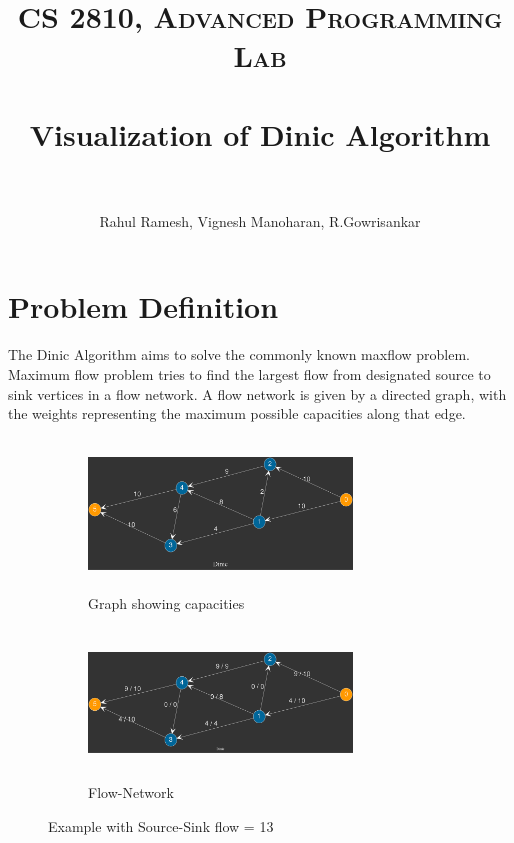 \documentclass[paper=a4, fontsize=11pt]{scrartcl} %
\title{
\normalfont \normalsize
\textsc{CS 2810, Advanced Programming Lab} \\ [25pt] %
\horrule{0.5pt} \\[0.4cm] %
\huge Visualization of Dinic Algorithm\\ %
\horrule{2pt} \\[0.5cm] %
}
\author{Rahul Ramesh, Vignesh Manoharan, R.Gowrisankar} %
\date{} %
\numberwithin{equation}{section} %
\numberwithin{figure}{section} %
\numberwithin{table}{section} %
\begin{document}
\maketitle %


\section{Problem Definition}

The Dinic Algorithm aims to solve the commonly known maxflow problem. Maximum flow problem tries to find the largest flow from designated source to sink vertices in a flow network. A flow network is given by a directed graph, with the weights representing the maximum possible capacities along that edge.

\begin{figure}[h]
\begin{subfigure}{0.5\textwidth}
\includegraphics[width=7cm, height=4cm,center]{p1.png}
\caption{Graph showing capacities}
\label{fig:subim1}
\end{subfigure}
\begin{subfigure}{0.5\textwidth}
\includegraphics[width=7cm, height=4cm,center]{p4.png}
\caption{Flow-Network}
\label{fig:subim2}
\end{subfigure}

\caption{Example with Source-Sink flow = 13}
\label{fig:image2}
\end{figure}
\end{document}
